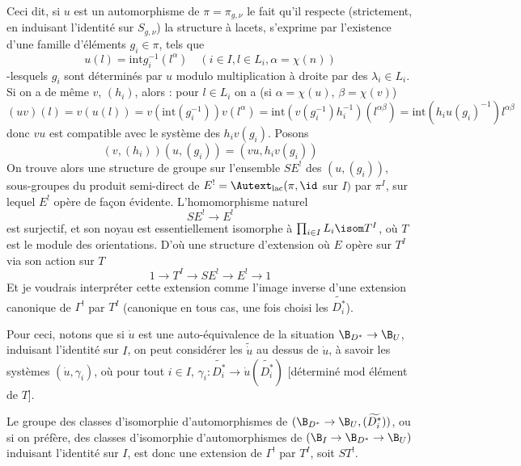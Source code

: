 Ceci dit, si $u$ est un automorphisme de $\pi = \pi_{g, \nu}$ le fait qu'il respecte (strictement, en induisant l'identité sur $S_{g, \nu}$) la structure à lacets, s'exprime par l'existence d'une famille d'éléments $g_i \in \pi$, tels que
$$
u(l) = \text{int}g^{-1}_i(l^\alpha) \quad (i \in I, l \in L_i, \alpha = \chi(n))
$$
-lesquels $g_i$ sont déterminés par $u$ modulo multiplication à droite par des $\lambda_i \in L_i$. Si on a de même $v$, $(h_i)$, alors : pour $l \in L_i$ on a (si $\alpha = \chi(u)$, $\beta = \chi(v)$)
$$
(uv)(l) = v(u(l)) = v(\text{int}(g^{-1}_i))v(l^\alpha) = \text{int}(v(g^{-1}_i) h^{-1}_i)(l^{\alpha \beta}) = \text{int}(h_i u(g_i)^{-1})l^{\alpha \beta}
$$
donc $vu$ est compatible avec le système des $h_i v(g_i)$. Posons 
$$
(v, (h_i))(u, (g_i)) = (vu, h_iv(g_i))
$$
On trouve alors une structure de groupe sur l'ensemble $S E^!$ des $(u, (g_i))$, sous-groupes du produit semi-direct de $E^! = \Autext_{\operatorname{lac}}(\pi, \id$ sur $I)$ par $\pi^I$, sur lequel $E^!$ opère de fa\c{c}on évidente. L'homomorphisme naturel
$$
SE^! \to E^!
$$
est surjectif, et son noyau est essentiellement isomorphe à $\prod_{i \in I} L_i \isom T^I$, où $T$ est le module des orientations. D'où une structure d'extension où $E$ opère sur $T^I$ via son action sur $T$
$$
1 \to T^I \to SE^! \to E^! \to 1
$$
Et je voudrais interpréter cette extension comme l'image inverse d'une extension canonique de $\Gamma^!$ par $T^I$ (canonique en tous cas, une fois choisi les $\widetilde{D^*_i}$).

Pour ceci, notons que si $\dot{u}$ est une auto-équivalence de la situation $\B_{D^*} \to \B_U$, induisant l'identité sur $I$, on peut considérer les $\tilde{\dot{u}}$ au dessus de $\dot{u}$, à savoir les systèmes $(\dot{u}, \gamma_i)$, où pour tout $i \in I$, $\gamma_i: \widetilde{D^*_i} \to \dot{u}(\widetilde{D^*_i})$ [déterminé mod élément de $T$].

Le groupe des classes d'isomorphie d'automorphismes de $(\B_{D^*} \to \B_U, (\widetilde{D^*_i}))$, ou si on préfère, des classes d'isomorphie d'automorphismes de $(\B_I \to \B_{D^*} \to \B_U)$ induisant l'identité sur $I$, est donc une extension de $\Gamma^!$ par $T^I$, soit $ST^!$. 

